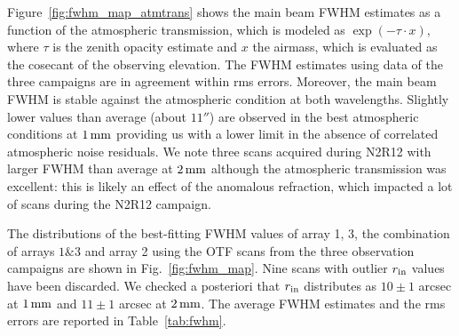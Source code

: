 Figure~\ref{fig:fwhm_map_atmtrans} shows the main beam FWHM estimates
as a function of the atmospheric transmission, which is modeled as
$\exp{\left(-\tau \cdot x\right)}$, where $\tau$ is the zenith opacity estimate and
$x$ the airmass, which is evaluated as the cosecant of the observing
elevation. The FWHM estimates using data of the three campaigns are in
agreement within rms errors. Moreover, the main beam FWHM is stable
against the atmospheric condition at both wavelengths. Slightly lower
values than average (about $11''$) are observed in the best
atmospheric conditions at $1\,\rm{mm}$ providing us with a lower limit
in the absence of correlated atmospheric noise residuals. We note
three scans acquired during N2R12 with larger FWHM than average at
$2\,\rm{mm}$ although the atmospheric transmission was excellent: this
is likely an effect of the anomalous refraction, which impacted
a lot of scans during the N2R12 campaign. 

The distributions of the best-fitting FWHM values of array 1, 3, the
combination of arrays $1\&3$ and array 2 using the OTF scans from the
three observation campaigns are shown in Fig.~\ref{fig:fwhm_map}. Nine
scans with outlier $r_{\rm{in}}$ values have been discarded.
We checked a posteriori that $r_{\rm{in}}$
distributes as $10 \pm 1$ arcsec at $1\,\rm{mm}$ and $11 \pm 1$ arcsec
at $2\,\rm{mm}$. The average FWHM estimates and the rms errors are
reported in Table~\ref{tab:fwhm}.  


